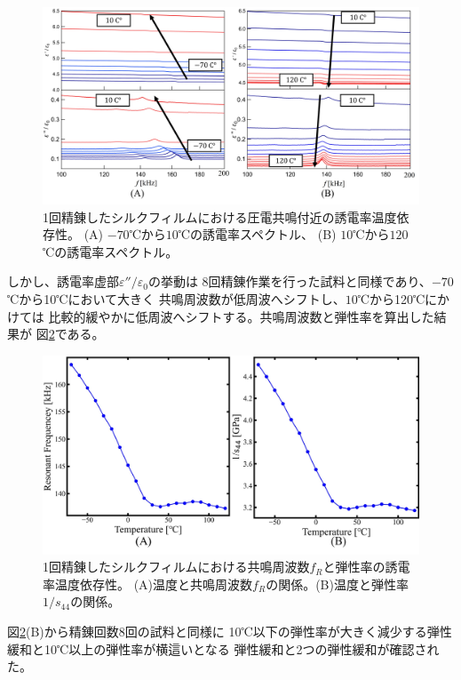 \documentclass[dvipdfmx,12pt,a4paper]{jreport}
\begin{document}
			\newpage
			\begin{figure}[h]
				\centering
				\includegraphics[width=\linewidth]{1回_誘電率温度依存性_圧電共鳴付近.jpg}
				\caption{1回精錬したシルクフィルムにおける圧電共鳴付近の誘電率温度依存性。
				(A) $-70$℃から$10$℃の誘電率スペクトル、
				(B) $10$℃から$120$℃の誘電率スペクトル。}
				\label{1回誘電率温度依存性_拡大図}
			\end{figure}
			\noindent
			しかし、誘電率虚部$\varepsilon''/\varepsilon_0$の挙動は
			8回精錬作業を行った試料と同様であり、$-70$℃から10℃において大きく
			共鳴周波数が低周波へシフトし、$10$℃から120℃にかけては
			比較的緩やかに低周波へシフトする。共鳴周波数と弾性率を算出した結果が
			図\ref{1回_共鳴周波数_弾性率_温度依存性}である。
			\begin{figure}[H]
				\centering
				\includegraphics[width=\linewidth]{1回_共鳴周波数_弾性率_温度依存性.jpg}
				\caption{1回精錬したシルクフィルムにおける共鳴周波数$f_R$と弾性率の誘電率温度依存性。
				(A)温度と共鳴周波数$f_R$の関係。(B)温度と弾性率$1/s_{44}$の関係。}
				\label{1回_共鳴周波数_弾性率_温度依存性}
			\end{figure}
			\newpage
			\noindent
			図\ref{1回_共鳴周波数_弾性率_温度依存性}(B)から精錬回数8回の試料と同様に
			10℃以下の弾性率が大きく減少する弾性緩和と10℃以上の弾性率が横這いとなる
			弾性緩和と2つの弾性緩和が確認された。
\end{document}
